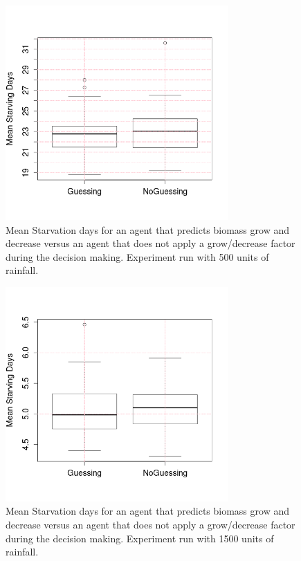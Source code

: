 \documentclass[11pt,oneside,a4paper,openright]{report}
\begin{document}
\begin{figure}[!htb]
\centering
\includegraphics[height=8.2cm]{figures/expm/guessVSnoguess_clim500.png}
\caption{Mean Starvation days for an agent that predicts biomass grow and decrease versus
an agent that does not apply a grow/decrease factor during the decision making. Experiment 
run with 500 units of rainfall. }
\label{fig:guessVSnoguess_clim500.png}
\end{figure}

\begin{figure}[!htb]
\centering
\includegraphics[height=8.2cm]{figures/expm/guessVSnoguess_clim1500.png}
\caption{Mean Starvation days for an agent that predicts biomass grow and decrease versus
an agent that does not apply a grow/decrease factor during the decision making. Experiment 
run with 1500 units of rainfall. }
\label{fig:guessVSnoguess_clim1500.png}
\end{figure}
\end{document}
